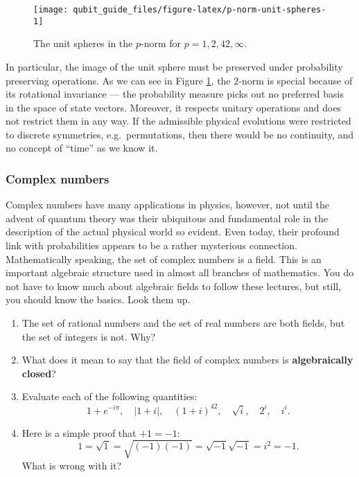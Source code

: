 \documentclass[fleqn]{article}
\providecommand{\tightlist}{%
  \setlength{\itemsep}{0pt}\setlength{\parskip}{0pt}}
\begin{document}
\begin{figure}[H]

{\centering \texttt{[image: qubit\_guide\_files/figure-latex/p-norm-unit-spheres-1]} 

}

\caption{The unit spheres in the \(p\)-norm for \(p=1,2,42,\infty\).}\label{fig:p-norm-unit-spheres}
\end{figure}

In particular, the image of the unit sphere must be preserved under probability preserving operations.
As we can see in Figure \ref{fig:p-norm-unit-spheres}, the \(2\)-norm is special because of its rotational invariance --- the probability measure picks out no preferred basis in the space of state vectors.
Moreover, it respects unitary operations and does not restrict them in any way.
If the admissible physical evolutions were restricted to discrete symmetries, e.g.~permutations, then there would be no continuity, and no concept of ``time'' as we know it.

\hypertarget{complex-numbers}{%
\subsubsection{Complex numbers}\label{complex-numbers}}

Complex numbers have many applications in physics, however, not until the advent of quantum theory was their ubiquitous and fundamental role in the description of the actual physical world so evident.
Even today, their profound link with probabilities appears to be a rather mysterious connection.
Mathematically speaking, the set of complex numbers is a field. This is an important algebraic structure used in almost all branches of mathematics.
You do not have to know much about algebraic fields to follow these lectures, but still, you should know the basics.
Look them up.

\begin{enumerate}
\def\labelenumi{\alph{enumi}.}
\tightlist
\item
  The set of rational numbers and the set of real numbers are both fields, but the set of integers is not. Why?
\item
  What does it mean to say that the field of complex numbers is \textbf{algebraically closed}?
\item
  Evaluate each of the following quantities:
  \[
   1+e^{-i\pi},
   \quad
   |1+i|,
   \quad
   (1+i)^{42},
   \quad
   \sqrt{i},
   \quad
   2^i,
   \quad
   i^i.
    \]
\item
  Here is a simple proof that \(+1=-1\): \[1=\sqrt{1}=\sqrt{(-1)(-1)}=\sqrt{-1}\sqrt{-1}=i^2=-1.\] What is wrong with it?
\end{enumerate}
\end{document}
